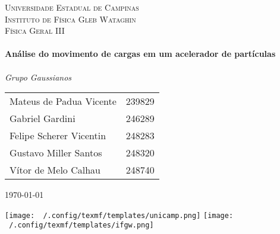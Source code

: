 \begin{titlepage}

	\center


	\textsc{\LARGE Universidade Estadual de Campinas}\\[1.5cm]

	\textsc{\Large Instituto de Física Gleb Wataghin}\\[0.5cm]

	\textsc{\large Física Geral III}\\[0.5cm]


	\HRule\\[0.4cm]

	{\huge\bfseries Análise do movimento de cargas em um acelerador de partículas}\\[0.4cm] %

	\HRule\\[1.5cm]

	{\large\textit{Grupo Gaussianos}} \\
	\begin{tabular}{ l r }
		Mateus de Padua Vicente & 239829 \\
		Gabriel Gardini         & 246289 \\
		Felipe Scherer Vicentin & 248283 \\
		Gustavo Miller Santos   & 248320 \\
		Vítor de Melo Calhau    & 248740
	\end{tabular}


	\vfill\vfill\vfill

	{\large\today}


	\vfill\vfill
	\texttt{[image: ~/.config/texmf/templates/unicamp.png]}
	\hfill
	\texttt{[image: ~/.config/texmf/templates/ifgw.png]}
\end{titlepage}
